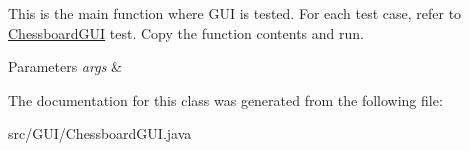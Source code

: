 This is the main function where G\+UI is tested. For each test case, refer to \hyperlink{class_g_u_i_1_1_chessboard_g_u_i}{Chessboard\+G\+UI} test. Copy the function contents and run. 
\begin{DoxyParams}{Parameters}
{\em args} & \\
\hline
\end{DoxyParams}


The documentation for this class was generated from the following file\+:\begin{DoxyCompactItemize}
\item 
src/\+G\+U\+I/Chessboard\+G\+U\+I.\+java\end{DoxyCompactItemize}
